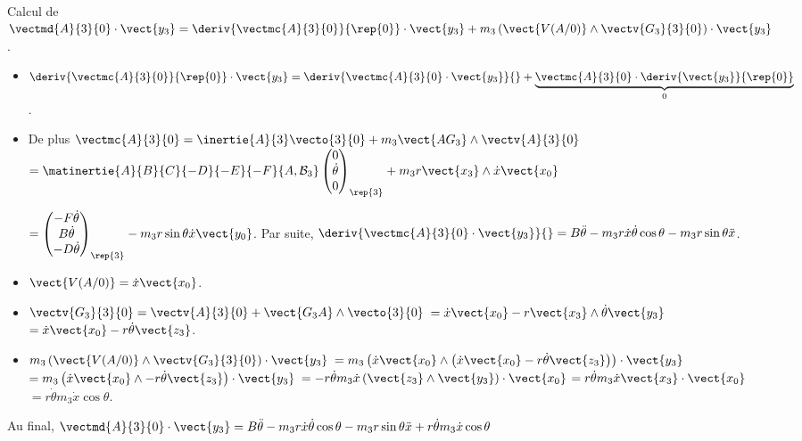 \begin{corrige} ~\\
Calcul de $\vectmd{A}{3}{0}\cdot \vect{y_3} = \deriv{\vectmc{A}{3}{0}}{\rep{0}}\cdot \vect{y_3} + m_3 \left(\vect{V(A/0)}\wedge\vectv{G_3}{3}{0}\right)\cdot \vect{y_3}$.
\begin{itemize}

\item  $\deriv{\vectmc{A}{3}{0}}{\rep{0}}\cdot \vect{y_3} =  \deriv{\vectmc{A}{3}{0}\cdot \vect{y_3}}{}+ \underbrace{\vectmc{A}{3}{0}\cdot \deriv{\vect{y_3}}{\rep{0}}}_{0}$.  

\item De plus $\vectmc{A}{3}{0} = \inertie{A}{3} \vecto{3}{0}  + m_3 \vect{AG_3}\wedge \vectv{A}{3}{0}$ 
$= \matinertie{A}{B}{C}{-D}{-E}{-F}{A,\mathcal{B}_3} \begin{pmatrix} 0  \\ \dot{\theta} \\ 0 \end{pmatrix}_{\rep{3}}
+ m_3 r\vect{x_3}\wedge \dot{x}\vect{x_0} $ 

$ =\begin{pmatrix} -F\dot{\theta}  \\ B\dot{\theta} \\ -D\dot{\theta} \end{pmatrix}_{\rep{3}} -  m_3 r\sin\theta \dot{x}\vect{y_0} $. Par suite, $\deriv{\vectmc{A}{3}{0}\cdot \vect{y_3}}{} = B\ddot{\theta} - m_3 r\dot{x}\dot{\theta}\cos\theta - m_3 r\sin\theta \ddot{x}$.

\item  $\vect{V(A/0)}  = \dot{x}\vect{x_0}$.

\item  $\vectv{G_3}{3}{0}  = \vectv{A}{3}{0}  + \vect{G_3A} \wedge \vecto{3}{0}$  $=\dot{x}\vect{x_0} -r \vect{x_3} \wedge \dot{\theta}\vect{y_3}$ $=\dot{x}\vect{x_0} -r  \dot{\theta}\vect{z_3}$.

\item $m_3 \left(\vect{V(A/0)}\wedge\vectv{G_3}{3}{0}\right)\cdot \vect{y_3}$ 
$ = m_3 \left(\dot{x}\vect{x_0}\wedge\left( \dot{x}\vect{x_0} -r  \dot{\theta}\vect{z_3}\right)\right)\cdot \vect{y_3}$
$ = m_3 \left(\dot{x}\vect{x_0}\wedge -r  \dot{\theta}\vect{z_3} \right)\cdot \vect{y_3}$
$ =-r  \dot{\theta} m_3 \dot{x} \left(\vect{z_3}\wedge \vect{y_3} \right)\cdot \vect{x_0}$
$ =r  \dot{\theta} m_3 \dot{x} \vect{x_3} \cdot \vect{x_0}$
$ =r  \dot{\theta} m_3 \dot{x} \cos \theta $.
\end{itemize}

Au final,  $\vectmd{A}{3}{0}\cdot \vect{y_3} = B\ddot{\theta} - m_3 r\dot{x}\dot{\theta}\cos\theta - m_3 r\sin\theta \ddot{x}+r  \dot{\theta} m_3 \dot{x} \cos \theta$
\end{corrige}
\else
\fi



